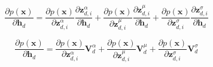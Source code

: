 \documentclass{article} %
\begin{document}
$$\frac{\partial p(\mathbf{x})}{\partial \mathbf{h}_d} = \frac{\partial p(\mathbf{x})}{\partial \mathbf{z}_{d,i}^{\alpha}} \frac{\partial \mathbf{z}_{d,i}^{\alpha}}{\partial \mathbf{h}_{d}} + \frac{\partial p(\mathbf{x})}{\partial \mathbf{z}_{d,i}^{\mu}} \frac{\partial \mathbf{z}_{d,i}^{\mu}}{\partial \mathbf{h}_{d}} + \frac{\partial p(\mathbf{x})}{\partial \mathbf{z}_{d,i}^{\sigma}} \frac{\partial \mathbf{z}_{d,i}^{\sigma}}{\partial \mathbf{h}_{d}}$$

$$\frac{\partial p(\mathbf{x})}{\partial \mathbf{h}_d} =  \frac{\partial p(\mathbf{x})}{\partial \mathbf{z}_{d,i}^{\alpha}} \mathbf{V}_{d}^{\alpha} + \frac{\partial p(\mathbf{x})}{\partial \mathbf{z}_{d,i}^{\mu}} \mathbf{V}_{d}^{\mu} + \frac{\partial p(\mathbf{x})}{\partial \mathbf{z}_{d,i}^{\sigma}} \mathbf{V}_{d}^{\sigma} $$
\end{document}
